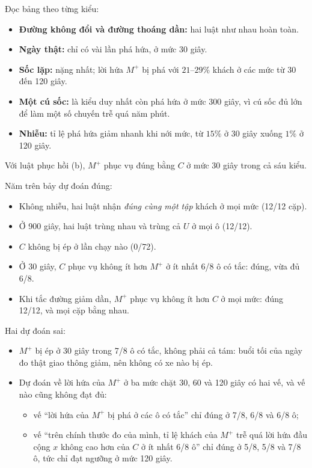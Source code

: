 Đọc bảng theo từng kiểu:
\begin{itemize}
\item \textbf{Đường không đổi và đường thoáng dần:} hai luật như nhau hoàn toàn.
\item \textbf{Ngày thật:} chỉ có vài lần phá hứa, ở mức 30 giây.
\item \textbf{Sốc lặp:} nặng nhất; lời hứa $M^{+}$ bị phá với $21$--$29\%$ khách ở các mức từ 30 đến 120 giây.
\item \textbf{Một cú sốc:} là kiểu duy nhất còn phá hứa ở mức 300 giây, vì cú sốc đủ lớn để làm một số
chuyến trễ quá năm phút.
\item \textbf{Nhiễu:} tỉ lệ phá hứa giảm nhanh khi nới mức, từ $15\%$ ở 30 giây xuống $1\%$ ở 120 giây.
\end{itemize}
Với luật phục hồi (b), $M^{+}$ phục vụ đúng bằng $C$ ở mức 30 giây trong cả sáu kiểu.

Năm trên bảy dự đoán đúng:
\begin{itemize}
\item Không nhiễu, hai luật nhận \emph{đúng cùng một tập} khách ở mọi mức (12/12 cặp).
\item Ở 900 giây, hai luật trùng nhau và trùng cả $U$ ở mọi ô (12/12).
\item $C$ không bị ép ở lần chạy nào (0/72).
\item Ở 30 giây, $C$ phục vụ không ít hơn $M^{+}$ ở ít nhất 6/8 ô có tắc: đúng, vừa đủ 6/8.
\item Khi tắc đường giảm dần, $M^{+}$ phục vụ không ít hơn $C$ ở mọi mức: đúng 12/12, và mọi cặp
bằng nhau.
\end{itemize}

Hai dự đoán sai:
\begin{itemize}
\item $M^{+}$ bị ép ở 30 giây trong 7/8 ô có tắc, không phải cả tám: buổi tối của ngày đo thật giao
thông giảm, nên không có xe nào bị ép.
\item Dự đoán về lời hứa của $M^{+}$ ở ba mức chặt 30, 60 và 120 giây có hai vế, và vế nào cũng không đạt
đủ:
  \begin{itemize}
  \item vế ``lời hứa của $M^{+}$ bị phá ở các ô có tắc'' chỉ đúng ở 7/8, 6/8 và 6/8 ô;
  \item vế ``trên chính thước đo của mình, tỉ lệ khách của $M^{+}$ trễ quá lời hứa đầu cộng $x$ không cao
  hơn của $C$ ở ít nhất 6/8 ô'' chỉ đúng ở 5/8, 5/8 và 7/8 ô, tức chỉ đạt ngưỡng ở mức 120 giây.
  \end{itemize}
\end{itemize}

